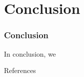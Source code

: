 \documentclass[handout,11.5pt]{beamer}
\begin{document}
\section{Conclusion}
\begin{frame}
	\frametitle{Conclusion}
	In conclusion, we 
\end{frame}

\begin{frame}{References}
	
	
\end{frame}

	
	
	
	
	
	
	
\end{document}
